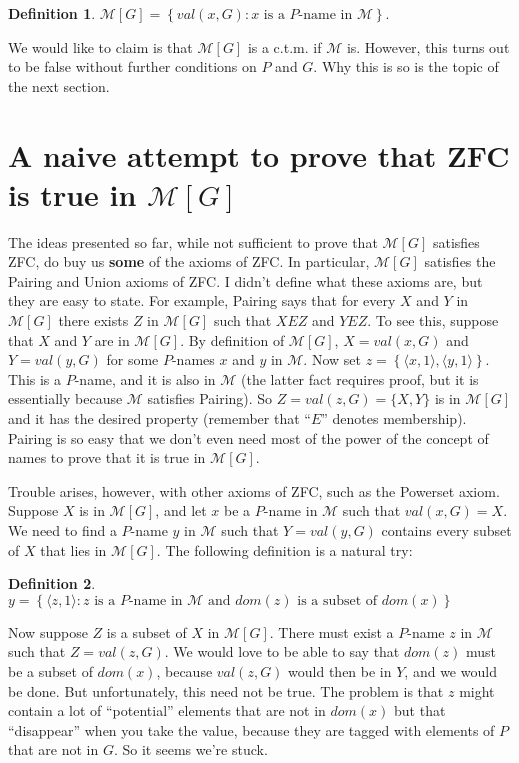\documentclass[10pt]{article}
\newcommand\axiom[1]{\textmd{#1}}
\theoremstyle{definition}
\newtheorem*{defn}{Definition}
\theoremstyle{remark}
\begin{document}
\begin{defn}
$\mathcal M[G] = \left\{val(x,G) : x\text{ is a }P\text{-name in }\mathcal M\right\}.$
\end{defn}

We would like to claim is that $\mathcal M[G]$ is a c.t.m. if $\mathcal M$ is. However, this turns out to be false without further conditions on $P$ and $G$. Why this is so is the topic of the next section.


\section{A naive attempt to prove that \axiom{ZFC} is true in $\mathcal M[G]$}

The ideas presented so far, while not sufficient to prove that $\mathcal M[G]$ satisfies \axiom{ZFC}, do buy us \textbf{some} of the axioms of \axiom{ZFC}. In particular, $\mathcal M[G]$ satisfies the Pairing and Union axioms of \axiom{ZFC}. I didn't define what these axioms are, but they are easy to state. For example, Pairing says that for every $X$ and $Y$ in $\mathcal M[G]$ there exists $Z$ in $\mathcal M[G]$ such that $X E Z$ and $Y E Z$. To see this, suppose that $X$ and $Y$ are in $\mathcal M[G]$. By definition of $\mathcal M[G]$, $X = val(x,G)$ and $Y = val(y,G)$ for some $P$-names $x$ and $y$ in $\mathcal M$. Now set $z = \left\{\langle x,1\rangle, \langle y,1\rangle\right\}$. This is a $P$-name, and it is also in $\mathcal M$ (the latter fact requires proof, but it is essentially because $\mathcal M$ satisfies Pairing). So $Z = val(z,G) = \{X,Y\}$ is in $\mathcal M[G]$ and it has the desired property (remember that ``$E$'' denotes membership). Pairing is so easy that we don't even need most of the power of the concept of names to prove that it is true in $\mathcal M[G]$.

Trouble arises, however, with other axioms of \axiom{ZFC}, such as the Powerset axiom. Suppose $X$ is in $\mathcal M[G]$, and let $x$ be a $P$-name in $\mathcal M$ such that $val(x,G) = X$. We need to find a $P$-name $y$ in $\mathcal M$ such that $Y = val(y,G)$ contains every subset of $X$ that lies in $\mathcal M[G]$. The following definition is a natural try:

\begin{defn}
$y = \left\{\langle z,1\rangle : z\text{ is a }P\text{-name in }\mathcal M\text{ and }dom(z)\text{ is a subset of }dom(x)\right\}$
\end{defn}

Now suppose $Z$ is a subset of $X$ in $\mathcal M[G]$. There must exist a $P$-name $z$ in $\mathcal M$ such that $Z = val(z,G)$. We would love to be able to say that $dom(z)$ must be a subset of $dom(x)$, because $val(z,G)$ would then be in $Y$, and we would be done. But unfortunately, this need not be true. The problem is that $z$ might contain a lot of ``potential'' elements that are not in $dom(x)$ but that ``disappear'' when you take the value, because they are tagged with elements of $P$ that are not in $G$. So it seems we're stuck.
\end{document}
